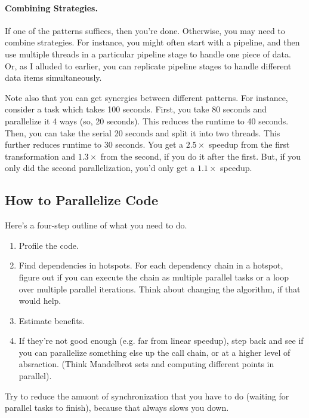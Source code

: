 \paragraph{Combining Strategies.} If one of the patterns suffices,
then you're done. Otherwise, you may need to combine strategies.
For instance, you might often start with a pipeline, and then 
use multiple threads in a particular pipeline stage to handle one
piece of data. Or, as I alluded to earlier, you can replicate
pipeline stages to handle different data items simultaneously.

Note also that you can get synergies between different patterns.
For instance, consider a task which takes 100 seconds. First, you
take 80 seconds and parallelize it 4 ways (so, 20 seconds). This
reduces the runtime to 40 seconds. Then, you can take the serial 
20 seconds and split it into two threads. This further reduces 
runtime to 30 seconds. You get a $2.5\times$ speedup from the
first transformation and $1.3\times$ from the second, if you do it
after the first. But, if you only did the second parallelization,
you'd only get a $1.1\times$ speedup.

\subsection*{How to Parallelize Code}
Here's a four-step outline of what you need to do.
\begin{enumerate}
\item Profile the code.
\item Find dependencies in hotspots. For each dependency chain in
a hotspot, figure out if you can execute the chain as
multiple parallel tasks or a loop over multiple parallel iterations.
Think about changing the algorithm, if that would help.
\item Estimate benefits. 
\item If they're not good enough (e.g. far from linear speedup),
step back and see if you can parallelize something else up the
call chain, or at a higher level of absraction.
(Think Mandelbrot sets and computing different points in parallel).
\end{enumerate}
Try to reduce the amuont of synchronization that you have to do
(waiting for parallel tasks to finish), because that always slows
you down.

